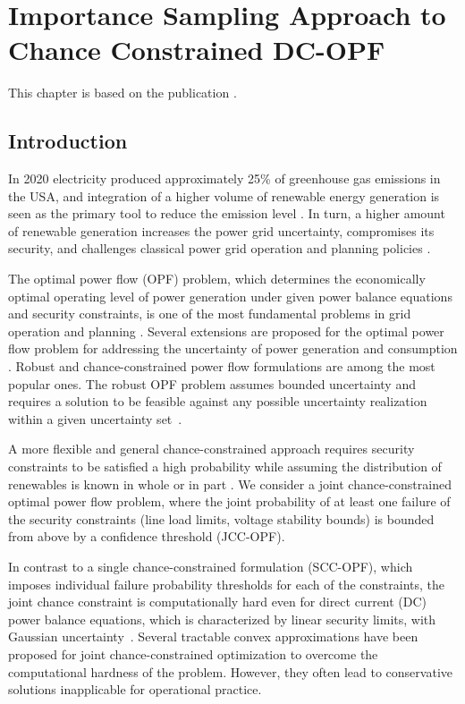 \chapter{Importance Sampling Approach to Chance Constrained DC-OPF}
This chapter is based on the publication .
\label{chap:dc_stochastic_approx}

\section{Introduction}

In 2020 electricity produced approximately 25\% of greenhouse gas emissions in the USA, and integration of a higher volume of renewable energy generation is seen as the primary tool to reduce the emission level \cite{hockstad2018inventory}. In turn, a higher amount of renewable generation increases the power grid uncertainty, compromises its security, and challenges classical power grid operation and planning policies \cite{koutsoyiannis2016unavoidable}. 

The optimal power flow (OPF) problem, which determines the economically optimal operating level of power generation under given power balance equations and security constraints, is one of the most fundamental problems in grid operation and planning \cite{stott2012optimal}. Several extensions are proposed for the optimal power flow problem for addressing the uncertainty of power generation and consumption \cite{geng2019data}. Robust and chance-constrained power flow formulations are among the most popular ones. The robust OPF problem assumes bounded uncertainty and requires a solution to be feasible against any possible uncertainty realization within a given uncertainty set~\cite{ben2002robust,ding2016adjustable,sousa2010robust}. 

A more flexible and general chance-constrained approach requires security constraints to be satisfied a high probability while assuming the distribution of renewables is known in whole or in part \cite{lubin2015robust, roald2017chance,bienstock2014chance,pena2020dc,mitrovic2023gp,mitrovic2023data}. We consider a joint chance-constrained optimal power flow problem, where the joint probability of at least one failure of the security constraints (line load limits, voltage stability bounds) is bounded from above by a confidence threshold (JCC-OPF). 

In contrast to a single chance-constrained formulation (SCC-OPF), which imposes individual failure probability thresholds for each of the constraints, the joint chance constraint is computationally hard even for direct current (DC) power balance equations, which is characterized by linear security limits, with Gaussian uncertainty~\cite{cousins2014cubic,khachiyan1993complexity}. Several tractable convex approximations have been proposed \cite{nemirovski2007convex, nemirovski2006scenario,nemirovski2003tractable,trofino1999bi} for joint chance-constrained optimization to overcome the computational hardness of the problem. However, they often lead to conservative solutions inapplicable for operational practice. 

